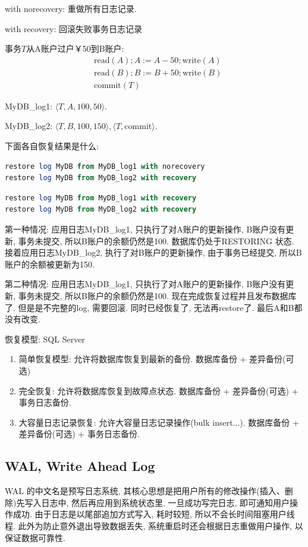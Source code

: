 with norecovery: 重做所有日志记录.

with recovery: 回滚失败事务日志记录

\begin{example}
事务$T$从A账户过户￥50到B账户:
\begin{align*}
    &\text{read}(A); A :=  A - 50; \text{write}(A) \\
    &\text{read}(B); B :=  B + 50; \text{write}(B) \\
    &\text{commit}(T)
\end{align*}

MyDB\_log1: $\langle T, A, 100, 50 \rangle$.

MyDB\_log2: $\langle T, B, 100, 150 \rangle, \langle T, \text{commit} \rangle$.

下面各自恢复结果是什么:
\begin{lstlisting}[language=SQL]
restore log MyDB from MyDB_log1 with norecovery
restore log MyDB from MyDB_log2 with recovery
\end{lstlisting}

\begin{lstlisting}[language=SQL]
restore log MyDB from MyDB_log1 with recovery
restore log MyDB from MyDB_log2 with recovery
\end{lstlisting}
\end{example}

第一种情况: 应用日志MyDB\_log1, 只执行了对A账户的更新操作, B账户没有更新, 事务未提交, 所以B账户的余额仍然是100. 数据库仍处于RESTORING 状态. 接着应用日志MyDB\_log2, 执行了对B账户的更新操作, 由于事务已经提交, 所以B账户的余额被更新为150.

第二种情况: 应用日志MyDB\_log1, 只执行了对A账户的更新操作, B账户没有更新, 事务未提交, 所以B账户的余额仍然是100. 现在完成恢复过程并且发布数据库了. 但是是不完整的log, 需要回滚. 同时已经恢复了, 无法再restore了. 最后A和B都没有改变.

恢复模型: SQL Server
\begin{enumerate}
    \item 简单恢复模型: 允许将数据库恢复到最新的备份. 数据库备份 + 差异备份(可选)
    \item 完全恢复: 允许将数据库恢复到故障点状态. 数据库备份 + 差异备份(可选) + 事务日志备份.
    \item 大容量日志记录恢复: 允许大容量日志记录操作(bulk insert...). 数据库备份 + 差异备份(可选) + 事务日志备份.
\end{enumerate}

\subsection{WAL, Write Ahead Log}

WAL 的中文名是预写日志系统, 其核心思想是把用户所有的修改操作(插入、删除)先写入日志中, 
然后再应用到系统状态里. 
一旦成功写完日志, 即可通知用户操作成功. 
由于日志是以尾部追加方式写入, 耗时较短, 所以不会长时间阻塞用户线程.
此外为防止意外退出导致数据丢失, 系统重启时还会根据日志重做用户操作, 以保证数据可靠性.


